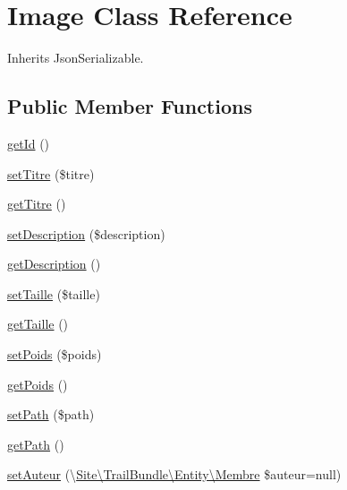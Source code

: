 \hypertarget{class_site_1_1_trail_bundle_1_1_entity_1_1_image}{}\section{Image Class Reference}
\label{class_site_1_1_trail_bundle_1_1_entity_1_1_image}


Inherits Json\+Serializable.

\subsection*{Public Member Functions}
\begin{DoxyCompactItemize}
\item 
\hyperlink{class_site_1_1_trail_bundle_1_1_entity_1_1_image_a12251d0c022e9e21c137a105ff683f13}{get\+Id} ()
\item 
\hyperlink{class_site_1_1_trail_bundle_1_1_entity_1_1_image_a1d7b0177b6a719345b3a99ec2b48c5a0}{set\+Titre} (\$titre)
\item 
\hyperlink{class_site_1_1_trail_bundle_1_1_entity_1_1_image_a11c380e71778af9871c5bd84b2f50eae}{get\+Titre} ()
\item 
\hyperlink{class_site_1_1_trail_bundle_1_1_entity_1_1_image_a31fad3e39336ea079ea758e051866627}{set\+Description} (\$description)
\item 
\hyperlink{class_site_1_1_trail_bundle_1_1_entity_1_1_image_a2e7bb35c71bf1824456ceb944cb7a845}{get\+Description} ()
\item 
\hyperlink{class_site_1_1_trail_bundle_1_1_entity_1_1_image_aaa380708a87b34e8cdaff585fc1f37ec}{set\+Taille} (\$taille)
\item 
\hyperlink{class_site_1_1_trail_bundle_1_1_entity_1_1_image_a1c5b53626ad0a104882ed2c9dcbaaffd}{get\+Taille} ()
\item 
\hyperlink{class_site_1_1_trail_bundle_1_1_entity_1_1_image_aea59eb86c705171ae8b25d7e43618f29}{set\+Poids} (\$poids)
\item 
\hyperlink{class_site_1_1_trail_bundle_1_1_entity_1_1_image_a106716fff20ae1369fb372ed225bd273}{get\+Poids} ()
\item 
\hyperlink{class_site_1_1_trail_bundle_1_1_entity_1_1_image_a5d101758b135bd36ba8992cc3bb67a24}{set\+Path} (\$path)
\item 
\hyperlink{class_site_1_1_trail_bundle_1_1_entity_1_1_image_a30c5c67b2bf8e2e2ccc7e361faa20afe}{get\+Path} ()
\item 
\hyperlink{class_site_1_1_trail_bundle_1_1_entity_1_1_image_a78acaef31f36bb40b76345e2a49f7fde}{set\+Auteur} (\textbackslash{}\hyperlink{class_site_1_1_trail_bundle_1_1_entity_1_1_membre}{Site\textbackslash{}\+Trail\+Bundle\textbackslash{}\+Entity\textbackslash{}\+Membre} \$auteur=null)

\end{DoxyCompactItemize}
